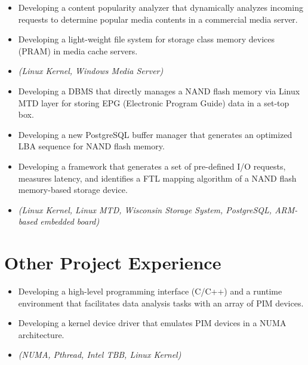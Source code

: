 \begin{itemize}
 \item {Developing a content popularity analyzer that dynamically analyzes incoming requests to determine
 popular media contents in a commercial media server.}
 \item{Developing a light-weight file system for storage class memory devices (PRAM) in media cache servers.}
 \item{\it\small(Linux Kernel, Windows Media Server)}
\end{itemize}

\begin{itemize}
\item{Developing a DBMS that directly manages a NAND flash
         memory via Linux MTD layer for storing EPG (Electronic Program Guide) data in a set-top box.}
\item{Developing a new PostgreSQL buffer manager
         that generates an optimized LBA sequence for NAND flash memory.}
\item{Developing a framework that generates a set of pre-defined I/O
	 requests, measures latency, and identifies a FTL mapping algorithm of a NAND flash memory-based storage device.}

\item{\it\small(Linux Kernel, Linux MTD, Wisconsin Storage System, PostgreSQL,
             ARM-based embedded board)}
\end{itemize}

\section{Other Project Experience}

\begin{itemize}
    \item {Developing a high-level programming interface (C/C++) and a runtime environment that
             facilitates data analysis tasks with an array of PIM devices.}
    \item {Developing a kernel device driver that emulates PIM devices in a NUMA architecture.}
    \item {\it\small(NUMA, Pthread, Intel TBB, Linux Kernel)}
\end{itemize}

